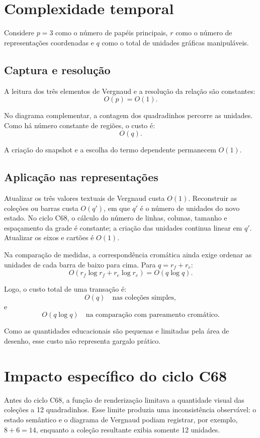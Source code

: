 \documentclass[12pt,a4paper]{article}
\begin{document}
\section{Complexidade temporal}

Considere $p=3$ como o número de papéis principais, $r$ como o número de representações coordenadas e $q$ como o total de unidades gráficas manipuláveis.

\subsection{Captura e resolução}

A leitura dos três elementos de Vergnaud e a resolução da relação são constantes:
\[
O(p)=O(1).
\]

No diagrama complementar, a contagem dos quadradinhos percorre as unidades. Como há número constante de regiões, o custo é:
\[
O(q).
\]

A criação do snapshot e a escolha do termo dependente permanecem $O(1)$.

\subsection{Aplicação nas representações}

Atualizar os três valores textuais de Vergnaud custa $O(1)$. Reconstruir as coleções ou barras custa $O(q')$, em que $q'$ é o número de unidades do novo estado. No ciclo C68, o cálculo do número de linhas, colunas, tamanho e espaçamento da grade é constante; a criação das unidades continua linear em $q'$. Atualizar os eixos e cartões é $O(1)$.

Na comparação de medidas, a correspondência cromática ainda exige ordenar as unidades de cada barra de baixo para cima. Para $q=r_f+r_e$:
\[
O(r_f\log r_f+r_e\log r_e)=O(q\log q).
\]

Logo, o custo total de uma transação é:
\[
O(q) \quad \text{nas coleções simples},
\]
e
\[
O(q\log q) \quad \text{na comparação com pareamento cromático}.
\]

Como as quantidades educacionais são pequenas e limitadas pela área de desenho, esse custo não representa gargalo prático.

\section{Impacto específico do ciclo C68}

Antes do ciclo C68, a função de renderização limitava a quantidade visual das coleções a 12 quadradinhos. Esse limite produzia uma inconsistência observável: o estado semântico e o diagrama de Vergnaud podiam registrar, por exemplo, $8+6=14$, enquanto a coleção resultante exibia somente 12 unidades.
\end{document}
